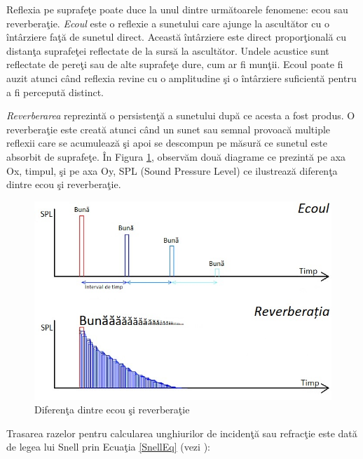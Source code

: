 	
	Reflexia pe suprafe\c{t}e poate duce la unul dintre urm\u{a}toarele fenomene: ecou sau reverbera\c{t}ie. {\it{Ecoul}} este o reflexie a sunetului care ajunge la ascult\u{a}tor cu o \^{i}nt\^{a}rziere fa\c{t}\u{a} de sunetul direct. Aceast\u{a} \^{i}nt\^{a}rziere este direct propor\c{t}ional\u{a} cu distan\c{t}a suprafe\c{t}ei reflectate de la surs\u{a} la ascult\u{a}tor. Undele acustice sunt reflectate de pere\c{t}i sau de alte suprafe\c{t}e dure, cum ar fi mun\c{t}ii. Ecoul poate fi auzit atunci c\^{a}nd reflexia revine cu o amplitudine \c{s}i o \^{i}nt\^{a}rziere suficient\u{a} pentru a fi perceput\u{a} distinct. 
	 
	
	{\it{Reverberarea}} reprezint\u{a} o persisten\c{t}\u{a} a sunetului dup\u{a} ce acesta a fost produs. O reverbera\c{t}ie este creat\u{a} atunci c\^{a}nd un sunet sau semnal provoac\u{a} multiple reflexii care se acumuleaz\u{a} \c{s}i apoi se descompun pe m\u{a}sur\u{a} ce sunetul este absorbit de suprafe\c{t}e. \^{I}n Figura \ref{Fig2}, observ\u{a}m dou\u{a} diagrame ce prezintă pe axa Ox, timpul, \c{s}i pe axa Oy, SPL (Sound Pressure Level) ce ilustreaz\u{a} diferen\c{t}a dintre ecou \c{s}i reverbera\c{t}ie. 
	
	\begin{figure}[!htb]
		\centering
		\includegraphics[width=1\linewidth]{imagini/EchoReverberation.jpg}
		\caption{Diferen\c{t}a dintre ecou \c{s}i reverbera\c{t}ie}
		\label{Fig2}
	\end{figure}

	Trasarea razelor pentru calcularea unghiurilor de inciden\c{t}\u{a} sau refrac\c{t}ie este dat\u{a} de legea lui Snell prin Ecua\c{t}ia \eqref{SnellEq} (vezi \cite{snell}):
	
